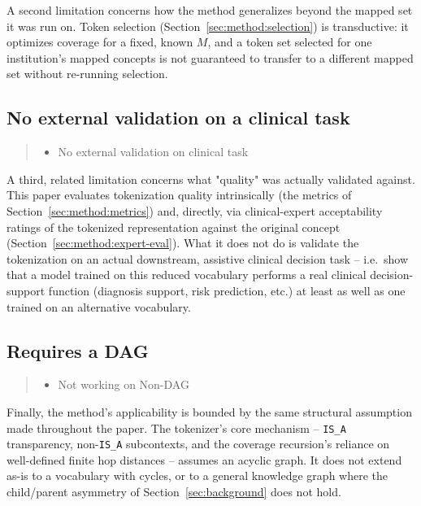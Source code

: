 A second limitation concerns how the method generalizes beyond the mapped
set it was run on. Token selection (Section~\ref{sec:method:selection}) is transductive: it
optimizes coverage for a fixed, known $M$, and a token set selected for one
institution's mapped concepts is not guaranteed to transfer to a different
mapped set without re-running selection.

\subsection{No external validation on a clinical task}

\begin{quote}\small\itshape
\begin{itemize}
\item No external validation on clinical task
\end{itemize}
\end{quote}

A third, related limitation concerns what "quality" was actually validated
against. This paper evaluates tokenization quality intrinsically (the metrics of
Section~\ref{sec:method:metrics}) and, directly, via clinical-expert
acceptability ratings of the tokenized representation against the original
concept (Section~\ref{sec:method:expert-eval}). What it does not do is
validate the tokenization on an actual downstream, assistive clinical
decision task -- i.e.\ show that a model trained on this reduced vocabulary
performs a real clinical decision-support function (diagnosis support, risk
prediction, etc.) at least as well as one trained on an alternative
vocabulary. 

\subsection{Requires a DAG}

\begin{quote}\small\itshape
\begin{itemize}
\item Not working on Non-DAG
\end{itemize}
\end{quote}

Finally, the method's applicability is bounded by the same structural
assumption made throughout the paper. The tokenizer's core mechanism -- \texttt{IS\_A} transparency, non-\texttt{IS\_A}
subcontexts, and the coverage recursion's reliance on well-defined finite hop
distances -- assumes an acyclic graph. It does not extend as-is to a
vocabulary with cycles, or to a general knowledge graph where the
child/parent asymmetry of Section~\ref{sec:background} does not hold.
